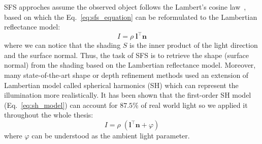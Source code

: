 SFS approches assume the observed object follows the Lambert's cosine law~\cite{klett1760ih}, based on which the Eq.~\ref{eq:sfs_equation} can be reformulated to the Lambertian reflectance model:
\begin{equation}\label{eq:lambertian_model}
    I = \rho \; \mathbf{l}^\top \mathbf{n}
\end{equation}
where we can notice that the shading $S$ is the inner product of the light direction and the surface normal.
Thus, the task of SFS is to retrieve the shape (surface normal) from the shading based on the Lambertian reflectance model.
Moreover, many state-of-the-art shape or depth refinement methods used an extension of Lambertian model called spherical harmonics (SH) \cite{basri2003lambertian, ramamoorthi2001relationship} which can represent the illumination more realistically. 
It has been shown that the first-order SH model (Eq.~\ref{eq:sh_model}) can account for $87.5\%$ of real world light so we applied it throughout the whole thesis:
\begin{equation}\label{eq:sh_model}
    I = \rho \; (\mathbf{l}^\top \mathbf{n} + \varphi)
\end{equation}
where $\varphi$ can be understood as the ambient light parameter.

